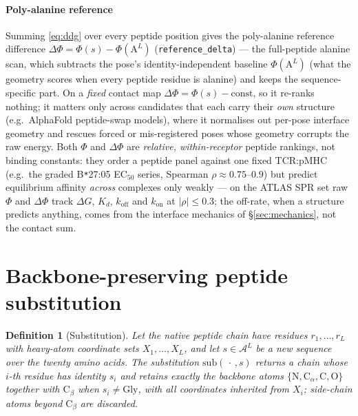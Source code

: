\documentclass[11pt]{article}
\theoremstyle{oldplain}
\theoremstyle{oldrem}
\newtheorem{definition}{Definition}
\newcommand{\Aset}{\mathcal{A}}
\begin{document}
\paragraph{Poly-alanine reference} Summing \eqref{eq:ddg} over every peptide position gives the
poly-alanine reference difference $\Delta\Phi=\Phi(s)-\Phi(\mathrm A^{L})$ (\texttt{reference\_delta}) ---
the full-peptide alanine scan, which subtracts the pose's identity-independent baseline $\Phi(\mathrm
A^{L})$ (what the geometry scores when every peptide residue is alanine) and keeps the sequence-specific
part. On a \emph{fixed} contact map $\Delta\Phi=\Phi(s)-\text{const}$, so it re-ranks nothing; it matters
only across candidates that each carry their \emph{own} structure (e.g.\ AlphaFold peptide-swap models),
where it normalises out per-pose interface geometry and rescues forced or mis-registered poses whose
geometry corrupts the raw energy. Both $\Phi$ and $\Delta\Phi$ are \emph{relative, within-receptor}
peptide rankings, not binding constants: they order a peptide panel against one fixed TCR:pMHC (e.g.\ the
graded B\texttt{*}27:05 EC$_{50}$ series, Spearman $\rho\approx0.75$--$0.9$) but predict equilibrium
affinity \emph{across} complexes only weakly --- on the ATLAS SPR set raw $\Phi$ and $\Delta\Phi$ track
$\Delta G$, $K_d$, $k_{\mathrm{off}}$ and $k_{\mathrm{on}}$ at $|\rho|\le0.3$; the off-rate, when a
structure predicts anything, comes from the interface mechanics of \S\ref{sec:mechanics}, not the
contact sum.

\section{Backbone-preserving peptide substitution}\label{sec:sub}
\begin{definition}[Substitution]\label{def:sub}
Let the native peptide chain have residues $r_1,\dots,r_L$ with heavy-atom coordinate sets
$X_1,\dots,X_L$, and let $s\in\Aset^L$ be a new sequence over the twenty amino acids. The
substitution $\mathrm{sub}(\,\cdot\,,s)$ returns a chain whose $i$-th residue has identity $s_i$ and
retains exactly the backbone atoms $\{\mathrm N,\mathrm C_\alpha,\mathrm C,\mathrm O\}$ together with
$\mathrm C_\beta$ when $s_i\neq\mathrm{Gly}$, with all coordinates inherited from $X_i$; side-chain
atoms beyond $\mathrm C_\beta$ are discarded.
\end{definition}
\end{document}
